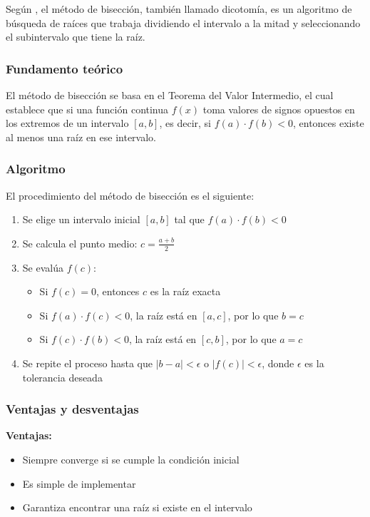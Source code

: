 \documentclass[12pt,a4paper]{article}
\begin{document}
Según \cite{wikipedia_biseccion}, el método de bisección, también llamado dicotomía, es un algoritmo de búsqueda de raíces que trabaja dividiendo el intervalo a la mitad y seleccionando el subintervalo que tiene la raíz.

\subsubsection{Fundamento teórico}

El método de bisección se basa en el Teorema del Valor Intermedio, el cual establece que si una función continua $f(x)$ toma valores de signos opuestos en los extremos de un intervalo $[a, b]$, es decir, si $f(a) \cdot f(b) < 0$, entonces existe al menos una raíz en ese intervalo.

\subsubsection{Algoritmo}

El procedimiento del método de bisección es el siguiente:

\begin{enumerate}
    \item Se elige un intervalo inicial $[a, b]$ tal que $f(a) \cdot f(b) < 0$
    \item Se calcula el punto medio: $c = \frac{a + b}{2}$
    \item Se evalúa $f(c)$:
    \begin{itemize}
        \item Si $f(c) = 0$, entonces $c$ es la raíz exacta
        \item Si $f(a) \cdot f(c) < 0$, la raíz está en $[a, c]$, por lo que $b = c$
        \item Si $f(c) \cdot f(b) < 0$, la raíz está en $[c, b]$, por lo que $a = c$
    \end{itemize}
    \item Se repite el proceso hasta que $|b - a| < \epsilon$ o $|f(c)| < \epsilon$, donde $\epsilon$ es la tolerancia deseada
\end{enumerate}

\subsubsection{Ventajas y desventajas}

\textbf{Ventajas:}
\begin{itemize}
    \item Siempre converge si se cumple la condición inicial
    \item Es simple de implementar
    \item Garantiza encontrar una raíz si existe en el intervalo
\end{itemize}
\end{document}
